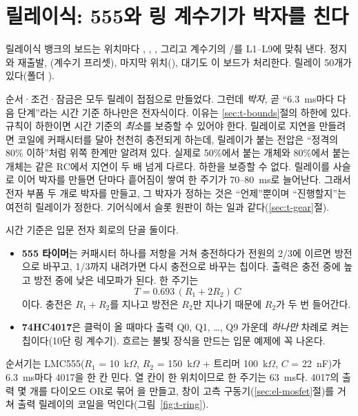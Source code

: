 \section{릴레이식: 555와 링 계수기가 박자를 친다}\label{sec:t-sequencer}

릴레이식 뱅크의  보드는 위치마다 ,
, , 그리고 계수기의 /를 L1--L9에 맞춰 낸다. 정지와 재출발,
(계수기 프리셋), 마지막 위치(), 대기도 이 보드가 처리한다. 릴레이 50개가 있다(폴더
).

\Why 순서·조건·잠금은 모두 릴레이 접점으로 만들었다. 그런데 \emph{박자}, 곧 ``6.3~ms마다 다음 단계''라는 시간
기준 하나만은 전자식이다. 이유는 \ref{sec:t-bounds}절의 하한에 있다. 규칙이 하한이면 시간 기준의 \emph{최소}를
보증할 수 있어야 한다. 릴레이로 지연을 만들려면 코일에 커패시터를 달아 천천히 충전되게 하는데, 릴레이가 붙는
전압은 ``정격의 80\% 이하''처럼 위쪽 한계만 알려져 있다. 실제로 50\%에서 붙는 개체와 80\%에서 붙는 개체는 같은
RC에서 지연이 두 배 넘게 다르다. 하한을 보증할 수 없다. 릴레이를 사슬로 이어 박자를 만들면 단마다 흩어짐이
쌓여 한 주기가 70--80~ms로 늘어난다. 그래서 전자 부품 두 개로 박자를 만들고, 그 박자가 정하는 것은 ``언제''뿐이며
``진행할지''는 여전히 릴레이가 정한다. 기어식에서 슬롯 원판이 하는 일과 같다(\ref{sec:t-gear}절).

\General 시간 기준은 입문 전자 회로의 단골 둘이다.
\begin{itemize}
\item \textbf{555 타이머}는 커패시터 하나를 저항을 거쳐 충전하다가 전원의 2/3에 이르면 방전으로 바꾸고, 1/3까지
내려가면 다시 충전으로 바꾸는 칩이다. 출력은 충전 중에 높고 방전 중에 낮은 네모파가 된다. 한 주기는
\[
  T = 0.693\,(R_1 + 2R_2)\,C
\]
이다. 충전은 $R_1 + R_2$를 지나고 방전은 $R_2$만 지나기 때문에 $R_2$가 두 번 들어간다.
\item \textbf{74HC4017}은 클럭이 올 때마다 출력 Q0, Q1, \ldots, Q9 가운데 \emph{하나만} 차례로 켜는 칩이다(10단
링 계수기). 흐르는 불빛 장식을 만드는 입문 예제에 꼭 나온다.
\end{itemize}

\Ours 순서기는 LMC555($R_1$ = 10~k$\Omega$, $R_2$ = 150~k$\Omega$ + 트리머 100~k$\Omega$, $C$ = 22~nF)가 6.3~ms마다
4017을 한 칸 민다. 열 칸이 한 위치이므로 한 주기는 63~ms다. 4017의 출력 몇 개를 다이오드 OR로 묶어
을 만들고, 창이 고측 구동기(\ref{sec:el-mosfet}절)를 거쳐 출력 릴레이의 코일을 먹인다(그림~\ref{fig:t-ring}).

